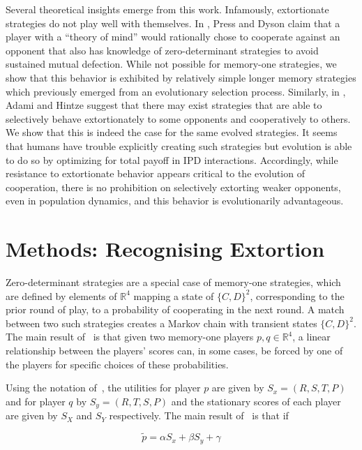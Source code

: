 \documentclass[a4paper]{article}
\begin{document}
Several theoretical insights emerge from this work. Infamously, extortionate
strategies do not play well with themselves. In \cite{Press2012},
Press and Dyson claim that a player with a ``theory of mind'' would
rationally chose to cooperate against an opponent that also has knowledge
of zero-determinant strategies to avoid sustained mutual defection. While not
possible for memory-one strategies, we show that this behavior is exhibited by
relatively simple longer memory strategies which previously emerged from an
evolutionary selection process. Similarly, in
\cite{adami2013evolutionary}, Adami and Hintze suggest that there may exist
strategies that are able to selectively behave extortionately to some opponents
and cooperatively to others. We show that this is indeed the case for the same
evolved strategies. It seems that humans have trouble explicitly creating such
strategies but evolution is able to do so by optimizing for total payoff in IPD
interactions. Accordingly, while resistance to extortionate behavior appears
critical to the evolution of cooperation, there is no prohibition on selectively
extorting weaker opponents, even in population dynamics, and this behavior is
evolutionarily advantageous.


\section{Methods: Recognising Extortion}\label{sec:sserror-zd-strategies}

Zero-determinant strategies are a special case of memory-one strategies,
which are defined by elements of \(\mathbb{R}^4\) mapping a state of
\({\{C, D\}}^2\), corresponding to the prior round of play, to a probability of
cooperating in the next round. A match between two such strategies creates a
Markov chain with transient states \({\{C, D\}}^2\). The main result
of~\cite{Press2012} is that given two memory-one players \(p,
q\in\mathbb{R}^4\), a linear relationship between the players' scores can, in
some cases, be forced by one of the players for specific choices of these
probabilities.

Using the notation of~\cite{Press2012}, the utilities for player \(p\)
are given by \(S_x=(R, S, T, P)\) and for player \(q\) by \(S_y=(R, T, S, P)\)
and the stationary scores of each player are given by \(S_X\) and \(S_Y\)
respectively. The main result of~\cite{Press2012} is that if

\begin{equation}\label{eqn:linear_relationship_for_p}
    \tilde p=\alpha S_x + \beta S_y + \gamma
\end{equation}
\end{document}
